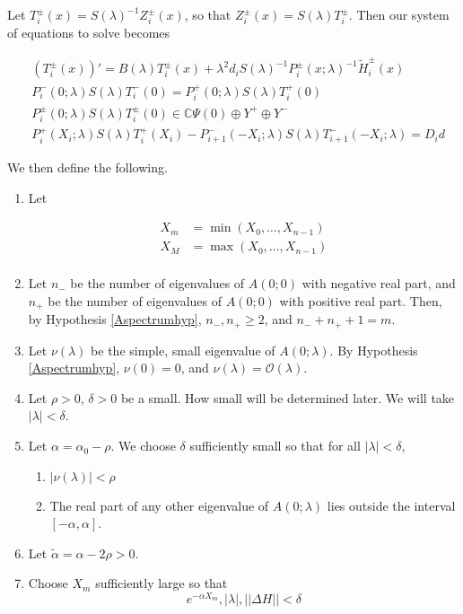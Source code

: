 \documentclass[12pt]{article}
\def\C{{\mathbb C}}
\begin{document}
Let $T_i^\pm(x) = S(\lambda)^{-1} Z_i^\pm(x)$, so that $Z_i^\pm(x) = S(\lambda) T_i^\pm$. Then our system of equations to solve becomes

\begin{align*}
&(T_i^\pm(x))' =  B(\lambda) T_i^\pm(x) + \lambda^2 d_i S(\lambda)^{-1} P_i^\pm(x; \lambda)^{-1} \tilde{H}_i^\pm(x) \\
&P_i^-(0; \lambda) S(\lambda) T_i^-(0) = P_i^+(0; \lambda) S(\lambda) T_i^+(0) \\
&P_i^\pm(0; \lambda) S(\lambda) T_i^\pm(0) \in \C \Psi(0) \oplus Y^+ \oplus Y^-\\
&P_i^+(X_i; \lambda) S(\lambda) T_i^+(X_i) - P_{i+1}^-(-X_i; \lambda) S(\lambda) T_{i+1}^-(-X_i; \lambda) = D_i d
\end{align*}

We then define the following.

\begin{enumerate}
	\item Let

	\begin{align*}
	X_m &= \min(X_0, \dots, X_{n-1}) \\
	X_M &= \max(X_0, \dots, X_{n-1}) \\
	\end{align*}

	\item Let $n_-$ be the number of eigenvalues of $A(0; 0)$ with negative real part, and $n_+$ be the number of eigenvalues of $A(0; 0)$ with positive real part. Then, by Hypothesis \ref{Aspectrumhyp}, $n_-, n_+ \geq 2$, and $n_- + n_+ + 1 = m$.

	\item Let $\nu(\lambda)$ be the simple, small eigenvalue of $A(0; \lambda)$. By Hypothesis \ref{Aspectrumhyp}, $\nu(0) = 0$, and $\nu(\lambda) = \mathcal{O}(\lambda)$. 

	\item Let $\rho > 0$, $\delta > 0$ be a small. How small will be determined later. We will take $|\lambda| < \delta$.

	\item Let $\alpha = \alpha_0 - \rho$. We choose $\delta$ sufficiently small so that for all $|\lambda| < \delta$,

	\begin{enumerate}
		\item $|\nu(\lambda)| < \rho$
		\item The real part of any other eigenvalue of $A(0; \lambda)$ lies outside the interval $[-\alpha, \alpha]$.
	\end{enumerate}

	\item Let $\tilde{\alpha} = \alpha - 2 \rho > 0$.

	\item Choose $X_m$ sufficiently large so that
	\begin{equation}
	e^{-\alpha X_m}, |\lambda|, ||\Delta H|| < \delta
	\end{equation}

\end{enumerate}
\end{document}
